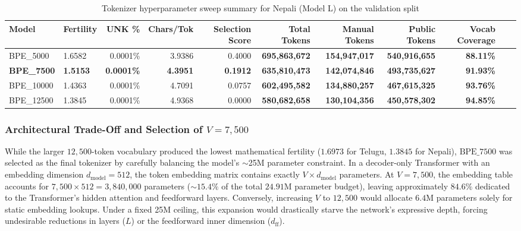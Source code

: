 \documentclass[8pt]{article}
\begin{document}
    \begin{table}[!htp]
        \centering
        \footnotesize %
        \setlength{\tabcolsep}{3.5pt} %
        \begin{tabular*}{\textwidth}{llrrrrrrrrr}
            \toprule
            \textbf{Model} & 
            \textbf{Fertility} & \textbf{UNK \%} & \textbf{Chars/Tok} &
            \textbf{Selection Score} & \textbf{Total Tokens} &
            \textbf{Manual Tokens} & \textbf{Public Tokens} & \textbf{Vocab Coverage} \\
            \midrule
    
            BPE\_5000 & 1.6582 & 0.0001\% & 3.9386 & 0.4000 &
            \textbf{695,863,672} & \textbf{154,947,017} & \textbf{540,916,655} & \textbf{88.11\%} \\
    
            \textbf{BPE\_7500} & 
            \textbf{1.5153} & \textbf{0.0001\%} & \textbf{4.3951} & \textbf{0.1912} &
            \textbf{635,810,473} & \textbf{142,074,846} & \textbf{493,735,627} & \textbf{91.93\%} \\
    
            BPE\_10000 & 1.4363 & 0.0001\% & 4.7091 & 0.0757 &
            \textbf{602,495,582} & \textbf{134,880,257} & \textbf{467,615,325} & \textbf{93.76\%} \\
    
            BPE\_12500 &  1.3845 & 0.0001\% & 4.9368 & 0.0000 &
            \textbf{580,682,658} & \textbf{130,104,356} & \textbf{450,578,302} & \textbf{94.85\%} \\
    
            \bottomrule
        \end{tabular*}
        \caption{Tokenizer hyperparameter sweep summary for Nepali (Model L) on the validation split}
        \label{tab:nepali_sweep}
    \end{table}

\subsubsection{Architectural Trade-Off and Selection of $V = 7,500$}
While the larger $12,500$-token vocabulary produced the lowest mathematical fertility ($1.6973$ for Telugu, $1.3845$ for Nepali), $\text{BPE\_7500}$ was selected as the final tokenizer by carefully balancing the model's $\sim$25M parameter constraint. In a decoder-only Transformer with an embedding dimension $d_{\text{model}} = 512$, the token embedding matrix contains exactly $V \times d_{\text{model}}$ parameters. At $V = 7,500$, the embedding table accounts for $7,500 \times 512 = 3,840,000$ parameters ($\sim 15.4\%$ of the total $24.91\text{M}$ parameter budget), leaving approximately $84.6\%$ dedicated to the Transformer's hidden attention and feedforward layers. Conversely, increasing $V$ to $12,500$ would allocate $6.4\text{M}$ parameters solely for static embedding lookups. Under a fixed 25M ceiling, this expansion would drastically starve the network's expressive depth, forcing undesirable reductions in layers ($L$) or the feedforward inner dimension ($d_{\text{ff}}$).
\end{document}
